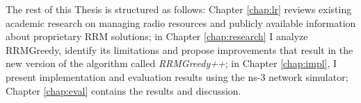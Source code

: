 
The rest of this Thesis is structured as follows: Chapter \ref{chap:lr} reviews existing academic research on managing radio resources and publicly available information about proprietary RRM solutions; in Chapter \ref{chap:research} I analyze RRMGreedy, identify its limitations and propose improvements that result in the new version of the algorithm called \textit{RRMGreedy++}; in Chapter \ref{chap:impl}, I present implementation and evaluation results using the ns-3 network simulator; Chapter \ref{chap:eval} contains the results and discussion.

